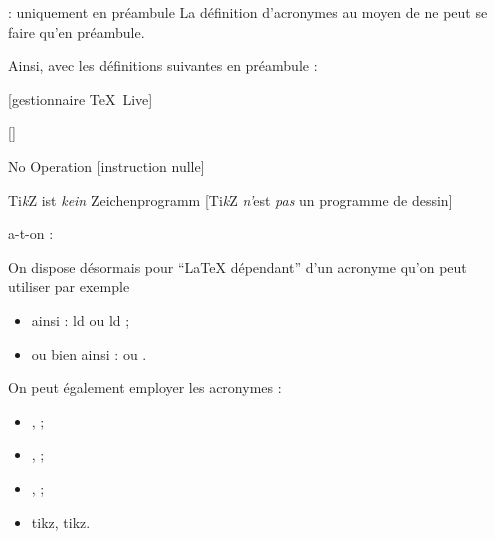 \documentclass{letgut}
\begin{document}
\begin{dbwarning}{ : uniquement en préambule}{}
  La définition d'acronymes au moyen de  ne peut se faire
  qu'en préambule.
\end{dbwarning}

Ainsi, avec les définitions suivantes en préambule :

\begin{ltx-code}[title addon=définition d'acronymes,listing options app={deletekeywords={[3]{TeX,LaTeX,emph,n,no}}}]

[gestionnaire \TeX~Live]

[]

{No Operation}
[instruction nulle]

{Ti\emph{k}Z ist \emph{kein} Zeichenprogramm}
[Ti\emph{k}Z \emph{n'}est \emph{pas} un programme de dessin]
\end{ltx-code}

a-t-on :

\begin{ltx-code-result}[title addon=utilisation d'acronymes,listing options app={deletekeywords={cd},deletekeywords={[3]{cd,tikz,LaTeX,on}},deletekeywords={[6]{cd}},deletekeywords={itemize},morekeywords={[2]{itemize}}}]
On dispose désormais pour \enquote{\LaTeX{} dépendant}
d'un acronyme qu'on peut utiliser par exemple
\begin{itemize}
\item ainsi : \ac{ld} ou \acs{ld} ;
\item ou bien ainsi : \ld{} ou \ld*{}.
\end{itemize}

On peut également employer les acronymes :
\begin{itemize}
\item \cd{}, \cd{} ;
\item \tlmgr{}, \tlmgr{} ;
\item \noop{}, \noop{} ;
\item \ac{tikz}, \ac{tikz}. %
\end{itemize}
\end{ltx-code-result}
\end{document}

